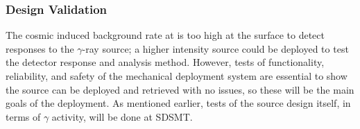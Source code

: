 




\subsubsection{ Design Validation}
The cosmic induced background rate at  is too high at the surface to detect responses to the  $\gamma$-ray source; a higher intensity source could be deployed to test the detector response and analysis method. However, tests of functionality,  reliability, and safety of the mechanical deployment system are essential to show the source can be deployed and retrieved with no issues, so these will be the main goals of the  deployment. As mentioned earlier, tests of the source design itself, in terms of $\gamma$ activity, will be done at SDSMT. 

